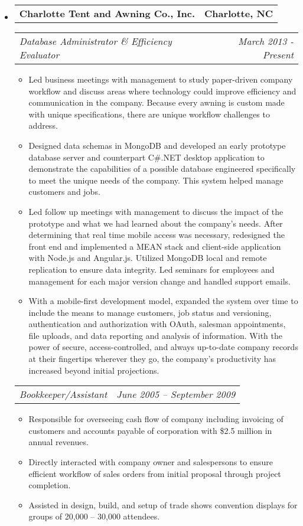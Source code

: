\documentclass[10pt,letterpaper]{article}
\makeatletter
\newcommand{\headerrow}[2]
{\begin{tabular*}{\linewidth}{l@{\extracolsep{\fill}}r}
	#1 &
	#2 \\
\end{tabular*}}
\makeatother
\begin{document}
\begin{itemize}
	\item
	\headerrow
		{\textbf{Charlotte Tent and Awning Co., Inc.}}
		{\textbf{Charlotte, NC}}
	\headerrow
		{\emph{Database Administrator \& Efficiency Evaluator}}
        {\emph{March 2013 - Present}}
	\begin{itemize}
		\item Led business meetings with management to study paper-driven company workflow and discuss areas where technology could improve efficiency and communication in the company.  Because every awning is custom made with unique specifications, there are unique workflow challenges to address.
        \item Designed data schemas in MongoDB and developed an early prototype database server and counterpart C\#.NET desktop application to demonstrate the capabilities of a possible database engineered specifically to meet the unique needs of the company.  This system helped manage customers and jobs.
        \item Led follow up meetings with management to discuss the impact of the prototype and what we had learned about the company's needs.  After determining that real time mobile access was necessary, redesigned the front end and implemented a MEAN stack and client-side application with Node.js and Angular.js.  Utilized MongoDB local and remote replication to ensure data integrity.  Led seminars for employees and management for each major version change and handled support emails.
        \item With a mobile-first development model, expanded the system over time to include the means to manage customers, job status and versioning, authentication and authorization with OAuth, salesman appointments, file uploads, and data reporting and analysis of information.  With the power of secure, access-controlled, and always up-to-date company records at their fingertips wherever they go, the company's productivity has increased beyond initial projections.

	\end{itemize}

	\headerrow
		{\emph{Bookkeeper/Assistant}}
		{\emph{June 2005 -- September 2009}}
	\begin{itemize}
		\item Responsible for overseeing cash flow of company including invoicing of customers and accounts payable of corporation with \$2.5 million in annual revenues.
		\item Directly interacted with company owner and salespersons to ensure efficient workflow of sales orders from initial proposal through project completion.
		\item Assisted in design, build, and setup of trade shows convention displays for groups of 20,000 -- 30,000 attendees.
	\end{itemize}


\end{itemize}
\end{document}
